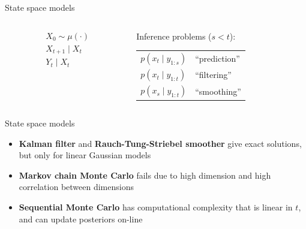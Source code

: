 \documentclass[aspectratio=169]{beamer}
\theoremstyle{definition}
\begin{document}
\begin{frame}{State space models}
\begin{columns}
\begin{column}{0.45\textwidth}
\begin{center}
\end{center}
\begin{align*}
& X_0 \sim \mu(\cdot) \\
& X_{t+1} \mid X_t \\ %
& Y_t \mid X_t %
\end{align*}
\end{column}
\begin{column}{0.45\textwidth}
\pause
Inference problems ($s<t$):

\renewcommand{\arraystretch}{1.5}
\begin{tabular}{l l}
$p(x_{t} \mid y_{1:s})$ & ``prediction'' \\
$p(x_{t} \mid y_{1:t})$ & ``filtering'' \\
$p(x_{s} \mid y_{1:t})$ & ``smoothing''
\end{tabular}
\end{column}
\end{columns}

\end{frame}

\begin{frame}{State space models}
\begin{itemize}
\item \textbf{Kalman filter} and \textbf{Rauch-Tung-Striebel smoother} give exact solutions, but only for linear Gaussian models
\item \textbf{Markov chain Monte Carlo} fails due to high dimension and high correlation between dimensions
\item \textbf{Sequential Monte Carlo} has computational complexity that is linear in $t$, and can update posteriors on-line
\end{itemize}
\end{frame}
\end{document}
